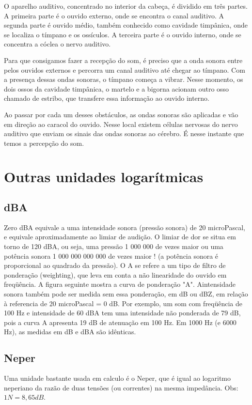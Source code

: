 \documentclass[
	article,			%
	11pt,				%
	oneside,			%
	a4paper,			%
	english,			%
	brazil,				%
	sumario=tradicional
	]{abntex2}
\begin{document}
O aparelho auditivo, concentrado no interior da cabeça, é dividido em três partes. A primeira parte é o ouvido externo, onde se encontra o canal auditivo. A segunda parte é ouvido médio, também conhecido como cavidade timpânica, onde se localiza o tímpano e os ossículos. A terceira parte é o ouvido interno, onde se concentra a cóclea o nervo auditivo.

Para que consigamos fazer a recepção do som, é preciso que a onda sonora entre pelos ouvidos externos e percorra um canal auditivo até chegar ao tímpano. Com a presença dessas ondas sonoras, o tímpano começa a vibrar. Nesse momento, os dois ossos da cavidade timpânica, o martelo e a bigorna acionam outro osso chamado de estribo, que transfere essa informação ao ouvido interno.

Ao passar por cada um desses obstáculos, as ondas sonoras são aplicadas e vão em direção ao caracol do ouvido. Nesse local existem células nervosas do nervo auditivo que enviam os sinais das ondas sonoras ao cérebro. É nesse instante que temos a percepção do som.

\section{Outras unidades logarítmicas}
\subsection{dBA}
Zero dBA equivale a uma intensidade sonora (pressão sonora) de
20 microPascal, e equivale aproximadamente ao limiar de audição. O limiar de
dor se situa em torno de 120 dBA, ou seja, uma pressão 1 000 000 de vezes
maior ou uma potência sonora 1 000 000 000 000 de vezes maior ! (a potência
sonora é proporcional ao quadrado da pressão). O A se refere a um tipo de
filtro de ponderação (weighting), que leva em conta a não linearidade do ouvido
em freqüência. A figura seguinte mostra a curva de ponderação "A". 
Aintensidade sonora também pode ser medida sem essa ponderação, em dB ou
dBZ, em relação à referencia de 20 microPascal = 0 dB. Por exemplo, um som
com freqüência de 100 Hz e intensidade de 60 dBA tem uma intensidade não
ponderada de 79 dB, pois a curva A apresenta 19 dB de atenuação em 100 Hz.
Em 1000 Hz (e 6000 Hz), as medidas em dB e dBA são idênticas.

\subsection{Neper}
Uma unidade bastante usada em calculo é o Neper, que é igual ao logaritmo neperiano da razão de duas tensões (ou correntes) na mesma impedância. Obs: $1 N = 8,65 dB.$
\end{document}
